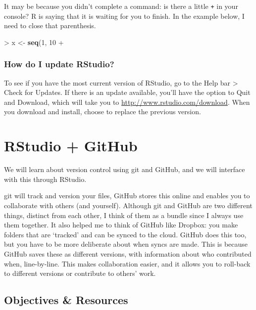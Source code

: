 \documentclass[]{book}
\newenvironment{Shaded}{\begin{snugshade}}{\end{snugshade}}
\newcommand{\KeywordTok}[1]{\textcolor[rgb]{0.13,0.29,0.53}{\textbf{{#1}}}}
\newcommand{\DecValTok}[1]{\textcolor[rgb]{0.00,0.00,0.81}{{#1}}}
\newcommand{\StringTok}[1]{\textcolor[rgb]{0.31,0.60,0.02}{{#1}}}
\newcommand{\NormalTok}[1]{{#1}}
\theoremstyle{definition}
\theoremstyle{definition}
\theoremstyle{definition}
\theoremstyle{remark}
\begin{document}
It may be because you didn't complete a command: is there a little
\texttt{+} in your console? R is saying that it is waiting for you to
finish. In the example below, I need to close that parenthesis.

\begin{Shaded}
\begin{Highlighting}[]
\NormalTok{>}\StringTok{ }\NormalTok{x <-}\StringTok{ }\KeywordTok{seq}\NormalTok{(}\DecValTok{1}\NormalTok{, }\DecValTok{10}
\NormalTok{+}\StringTok{ }
\end{Highlighting}
\end{Shaded}

\subsection{How do I update RStudio?}\label{how-do-i-update-rstudio}

To see if you have the most current version of RStudio, go to the Help
bar \textgreater{} Check for Updates. If there is an update available,
you'll have the option to Quit and Download, which will take you to
\url{http://www.rstudio.com/download}. When you download and install,
choose to replace the previous version.

\hypertarget{github}{\chapter{RStudio + GitHub}\label{github}}

We will learn about version control using git and GitHub, and we will
interface with this through RStudio.

git will track and version your files, GitHub stores this online and
enables you to collaborate with others (and yourself). Although git and
GitHub are two different things, distinct from each other, I think of
them as a bundle since I always use them together. It also helped me to
think of GitHub like Dropbox: you make folders that are `tracked' and
can be synced to the cloud. GitHub does this too, but you have to be
more deliberate about when syncs are made. This is because GitHub saves
these as different versions, with information about who contributed
when, line-by-line. This makes collaboration easier, and it allows you
to roll-back to different versions or contribute to others' work.

\section{Objectives \& Resources}\label{objectives-resources}
\end{document}
